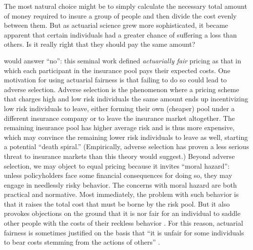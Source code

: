 \documentclass[sigconf]{acmart}
\begin{document}
The most natural choice might be to simply calculate the necessary total amount of money required to insure a group of people and then divide the cost evenly between them. But as actuarial science grew more sophisticated, it became apparent that certain individuals had a greater chance of suffering a loss than others. Is it really right that they should pay the same amount? 

\citet{arrow1978uncertainty} would answer \enquote{no}: this seminal work defined \emph{actuarially fair} pricing as that in which each participant in the insurance pool pays their expected costs. One motivation for using actuarial fairness is that failing to do so could lead to adverse selection. Adverse selection is the phenomenon where a pricing scheme that charges high and low risk individuals the same amount ends up incentivizing low risk individuals to leave, either forming their own (cheaper) pool under a different insurance company or to leave the insurance market altogether. The remaining insurance pool has higher average risk and is thus more expensive, which may convince the remaining lower risk individuals to leave as well, starting a potential \enquote{death spiral.} (Empirically, adverse selection has proven a less serious threat to insurance markets \cite{siegelman2003adverse} than this theory would suggest.) Beyond adverse selection, we may object to equal pricing because it invites \enquote{moral hazard}: unless policyholders face some financial consequences for doing so, they may engage in needlessly risky behavior. The concerns with moral hazard are both practical and normative. Most immediately, the problem with such behavior is that it raises the total cost that must be borne by the risk pool. But it also provokes objections on the ground that it is nor fair for an individual to saddle other people with the costs of their reckless behavior \cite{mas1995microeconomic}. For this reason, actuarial fairness is sometimes justified on the basis that \enquote{it is unfair for some individuals to bear costs stemming from the actions of others} \cite{landes2015fair}. 
\end{document}
